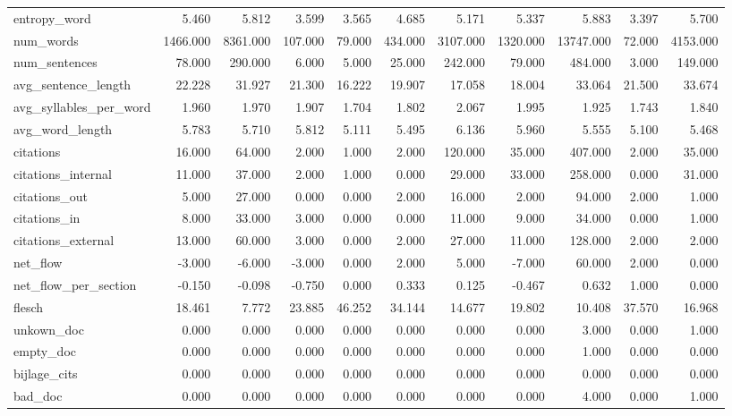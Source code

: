\begin{tabular}{lrrrrrrrrrr}
\cline{1-11}
entropy\_word & 5.460 & 5.812 & 3.599 & 3.565 & 4.685 & 5.171 & 5.337 & 5.883 & 3.397 & 5.700 \\
\cline{1-11}
num\_words & 1466.000 & 8361.000 & 107.000 & 79.000 & 434.000 & 3107.000 & 1320.000 & 13747.000 & 72.000 & 4153.000 \\
\cline{1-11}
num\_sentences & 78.000 & 290.000 & 6.000 & 5.000 & 25.000 & 242.000 & 79.000 & 484.000 & 3.000 & 149.000 \\
\cline{1-11}
avg\_sentence\_length & 22.228 & 31.927 & 21.300 & 16.222 & 19.907 & 17.058 & 18.004 & 33.064 & 21.500 & 33.674 \\
\cline{1-11}
avg\_syllables\_per\_word & 1.960 & 1.970 & 1.907 & 1.704 & 1.802 & 2.067 & 1.995 & 1.925 & 1.743 & 1.840 \\
\cline{1-11}
avg\_word\_length & 5.783 & 5.710 & 5.812 & 5.111 & 5.495 & 6.136 & 5.960 & 5.555 & 5.100 & 5.468 \\
\cline{1-11}
citations & 16.000 & 64.000 & 2.000 & 1.000 & 2.000 & 120.000 & 35.000 & 407.000 & 2.000 & 35.000 \\
\cline{1-11}
citations\_internal & 11.000 & 37.000 & 2.000 & 1.000 & 0.000 & 29.000 & 33.000 & 258.000 & 0.000 & 31.000 \\
\cline{1-11}
citations\_out & 5.000 & 27.000 & 0.000 & 0.000 & 2.000 & 16.000 & 2.000 & 94.000 & 2.000 & 1.000 \\
\cline{1-11}
citations\_in & 8.000 & 33.000 & 3.000 & 0.000 & 0.000 & 11.000 & 9.000 & 34.000 & 0.000 & 1.000 \\
\cline{1-11}
citations\_external & 13.000 & 60.000 & 3.000 & 0.000 & 2.000 & 27.000 & 11.000 & 128.000 & 2.000 & 2.000 \\
\cline{1-11}
net\_flow & -3.000 & -6.000 & -3.000 & 0.000 & 2.000 & 5.000 & -7.000 & 60.000 & 2.000 & 0.000 \\
\cline{1-11}
net\_flow\_per\_section & -0.150 & -0.098 & -0.750 & 0.000 & 0.333 & 0.125 & -0.467 & 0.632 & 1.000 & 0.000 \\
\cline{1-11}
flesch & 18.461 & 7.772 & 23.885 & 46.252 & 34.144 & 14.677 & 19.802 & 10.408 & 37.570 & 16.968 \\
\cline{1-11}
unkown\_doc & 0.000 & 0.000 & 0.000 & 0.000 & 0.000 & 0.000 & 0.000 & 3.000 & 0.000 & 1.000 \\
\cline{1-11}
empty\_doc & 0.000 & 0.000 & 0.000 & 0.000 & 0.000 & 0.000 & 0.000 & 1.000 & 0.000 & 0.000 \\
\cline{1-11}
bijlage\_cits & 0.000 & 0.000 & 0.000 & 0.000 & 0.000 & 0.000 & 0.000 & 0.000 & 0.000 & 0.000 \\
\cline{1-11}
bad\_doc & 0.000 & 0.000 & 0.000 & 0.000 & 0.000 & 0.000 & 0.000 & 4.000 & 0.000 & 1.000 \\
\cline{1-11}
\bottomrule
\end{tabular}
